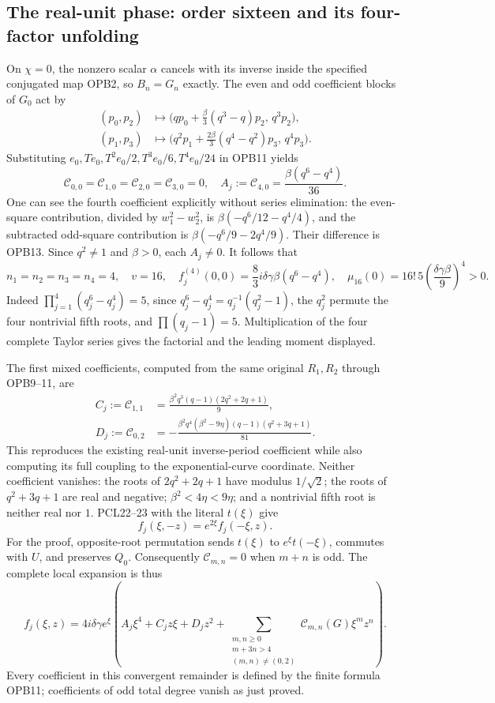 \documentclass[11pt]{article}
\begin{document}
\subsection{The real-unit phase: order sixteen and its four-factor unfolding}
On $\chi=0$, the nonzero scalar $\alpha$ cancels with its inverse
inside the specified conjugated map OPB2, so $B_n=G_n$ exactly.
The even and odd coefficient blocks of $G_0$ act by
\[
 \begin{split}
 (p_0,p_2)&\longmapsto
 \bigl(qp_0+\tfrac\beta3(q^3-q)p_2,\,q^3p_2\bigr),\\
 (p_1,p_3)&\longmapsto
 \bigl(q^2p_1+\tfrac{2\beta}3(q^4-q^2)p_3,\,q^4p_3\bigr).
 \end{split}\tag{OPB12}
\]
Substituting $e_0,T e_0,T^2e_0/2,T^3e_0/6,T^4e_0/24$
in OPB11 yields
\[
 \mathcal C_{0,0}=\mathcal C_{1,0}=\mathcal C_{2,0}
 =\mathcal C_{3,0}=0,\quad
 A_j:=\mathcal C_{4,0}=\frac{\beta(q^6-q^4)}{36}.
 \tag{OPB13}
\]
One can see the fourth coefficient explicitly without series elimination:
the even-square contribution, divided by $w_1^2-w_2^2$, is
$\beta(-q^6/12-q^4/4)$, and the subtracted odd-square contribution
is $\beta(-q^6/9-2q^4/9)$. Their difference is OPB13.
Since $q^2\ne1$ and $\beta>0$, each $A_j\ne0$. It follows that
\[
 n_1=n_2=n_3=n_4=4,\quad v=16,\quad
 f_j^{(4)}(0,0)=\frac83i\delta\gamma\beta(q^6-q^4),\quad
 \boxed{\mu_{16}(0)=16!\,5\left(\frac{\delta\gamma\beta}{9}\right)^4>0.}
 \tag{OPB14}
\]
Indeed $\prod_{j=1}^4(q_j^6-q_j^4)=5$, since $q_j^6-q_j^4
=q_j^{-1}(q_j^2-1)$, the $q_j^2$ permute the four nontrivial fifth
roots, and $\prod(q_j-1)=5$. Multiplication of the four complete
Taylor series gives the factorial and the leading moment displayed.

The first mixed coefficients, computed from the same original $R_1,R_2$
through OPB9--11, are
\[
 \begin{split}
 C_j:=\mathcal C_{1,1}
 &=\frac{\beta^2q^3(q-1)(2q^2+2q+1)}9,\\
 D_j:=\mathcal C_{0,2}
 &=-\frac{\beta^2q^4(\beta^2-9\eta)(q-1)(q^2+3q+1)}{81}.
 \end{split}\tag{OPB15}
\]
This reproduces the existing real-unit inverse-period coefficient while
also computing its full coupling to the exponential-curve coordinate.
Neither coefficient vanishes: the roots of $2q^2+2q+1$ have modulus
$1/\sqrt2$; the roots of $q^2+3q+1$ are real and negative;
$\beta^2<4\eta<9\eta$; and a nontrivial fifth root is neither real
nor $1$. PCL22--23 with the literal $t(\xi)$ give
\[
 f_j(\xi,-z)=e^{2\xi}f_j(-\xi,z).
 \tag{OPB16}
\]
For the proof, opposite-root permutation sends $t(\xi)$ to
$e^\xi t(-\xi)$, commutes with $U$, and preserves $Q_0$.
Consequently $\mathcal C_{m,n}=0$ when $m+n$ is odd. The complete
local expansion is thus
\[
 f_j(\xi,z)=4i\delta\gamma e^\xi
 \left(A_j\xi^4+C_jz\xi+D_jz^2+
       \sum_{\substack{m,n\ge0\\m+3n>4\\(m,n)\ne(0,2)}}
           \mathcal C_{m,n}(G)\xi^mz^n\right).
 \tag{OPB17}
\]
Every coefficient in this convergent remainder is defined by the finite
formula OPB11; coefficients of odd total degree vanish as just proved.
\end{document}
